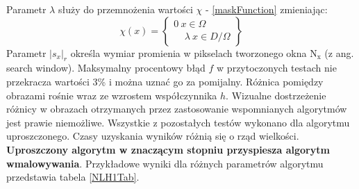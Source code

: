 \documentclass[12pt, twoside, openany]{report}
\theoremstyle{definition}
\begin{document}
Parametr $\lambda$ służy do przemnożenia wartości $\chi$ - \eqref{maskFunction} zmieniając:
\begin{equation}
\chi \left(x\right)=\left\{ \begin{array}{c}
0\ x \in \Omega \\ 
\ \ \ \ \ \lambda\ x \in D/ \Omega \end{array}
\right\}
\end{equation}
Parametr $|s_x|_r$ określa wymiar promienia w pikselach tworzonego okna $\mathrm{N_x}$ (z ang. search window).
Maksymalny procentowy błąd $f$ w przytoczonych testach nie przekracza wartości 3\% i można uznać go za pomijalny. Różnica pomiędzy obrazami rośnie wraz ze wzrostem współczynnika $h$. Wizualne dostrzeżenie różnicy w obrazach otrzymanych przez zastosowanie wspomnianych algorytmów jest prawie niemożliwe. Wszystkie z pozostałych testów wykonano dla algorytmu uproszczonego. Czasy uzyskania wyników różnią się o rząd wielkości. \textbf{Uproszczony algorytm w znaczącym stopniu przyspiesza algorytm wmalowywania}. Przykładowe wyniki dla różnych parametrów algorytmu przedstawia tabela \autoref{NLH1Tab}.
\end{document}
